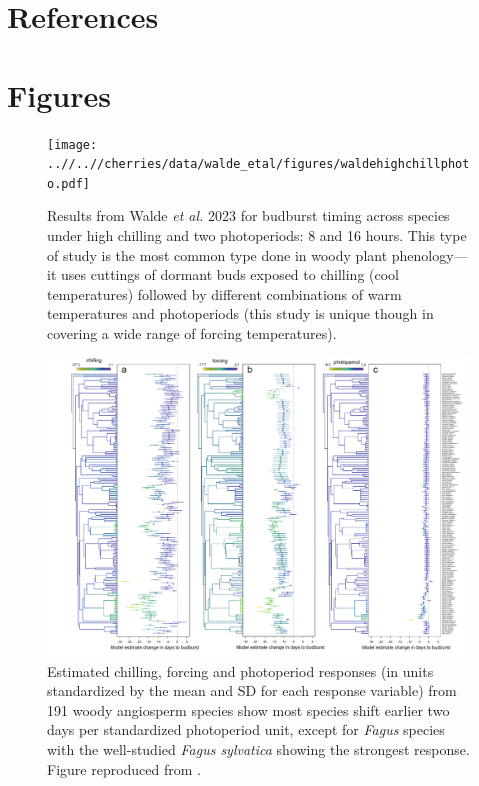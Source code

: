\documentclass[11pt]{article}
\begin{document}
\clearpage
\section*{References}



\section*{Figures}

\begin{figure}[h!]
\texttt{[image: ..//..//cherries/data/walde\_etal/figures/waldehighchillphoto.pdf]}
\caption{Results from Walde \emph{et al.} 2023 for budburst timing across species under high chilling and two photoperiods: 8 and 16 hours. This type of study is the most common type done in woody plant phenology---it uses cuttings of dormant buds exposed to chilling (cool temperatures) followed by different combinations of warm temperatures and photoperiods (this study is unique though in covering a wide range of forcing temperatures).} %
\label{fig:waldedata}
\end{figure}


\begin{figure}[h!]
\includegraphics[width=1\textwidth]{..//figures/Fig1_phylo_muplots191.pdf}
\caption{Estimated chilling, forcing and photoperiod responses (in units standardized by the mean and SD for each response variable) from 191 woody angiosperm species show most species shift earlier two days per standardized photoperiod unit, except for \emph{Fagus} species with the well-studied \emph{Fagus sylvatica} showing the strongest response. Figure reproduced from \citet{morales2024phylogenetic}.} 
\label{fig:phylopheno}
\end{figure}
\end{document}
